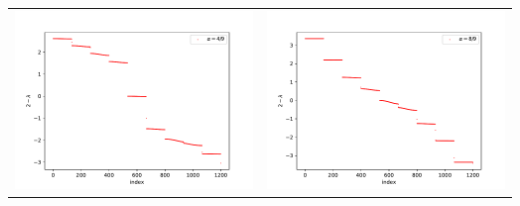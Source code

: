 \documentclass[a4paper,zihao=5,UTF8]{ctexart}
\begin{document}
\begin{table}[htbp]
\begin{tabular}[htbp]{cc}
			\includegraphics[scale=0.5]{5_alpha_4_9.pdf} & \includegraphics[scale=0.5]{5_alpha_8_9.pdf} \\

\end{tabular}
\end{table}
\end{document}
